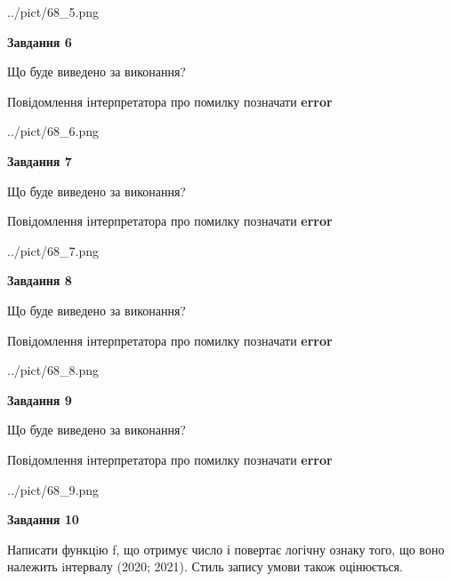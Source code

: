 \documentclass[12pt, ukrainian]{article}
\begin{document}
{\begin {large}
\begin{center}
	{../pict/68_5.png}
\end{center}
\newpage

{\begin {center}\textbf{Завдання 6}\end {center}}\par
Що буде виведено за виконання? \par
Повідомлення інтерпретатора про помилку позначати \textbf{error}

\begin{center}
	{../pict/68_6.png}
\end{center}
\newpage

{\begin {center}\textbf{Завдання 7}\end {center}}\par
Що буде виведено за виконання? \par
Повідомлення інтерпретатора про помилку позначати \textbf{error}

\begin{center}
	{../pict/68_7.png}
\end{center}
\newpage

{\begin {center}\textbf{Завдання 8}\end {center}}\par
Що буде виведено за виконання? \par
Повідомлення інтерпретатора про помилку позначати \textbf{error}

\begin{center}
	{../pict/68_8.png}
\end{center}
\newpage

{\begin {center}\textbf{Завдання 9}\end {center}}\par
Що буде виведено за виконання? \par
Повідомлення інтерпретатора про помилку позначати \textbf{error}

\begin{center}
	{../pict/68_9.png}
\end{center}
\newpage

{\begin {center}\textbf{Завдання 10}\end {center}}\par

Написати функцiю f, що отримує число і повертає логічну ознаку того, що воно належить iнтервалу (2020; 2021). Стиль запису умови також оцінюється.\par
\newpage

\end {large}}
\end{document}
